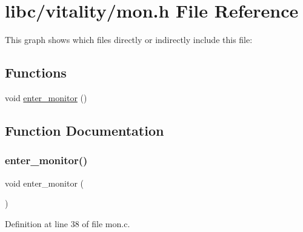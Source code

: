 \hypertarget{a00170}{}\section{libc/vitality/mon.h File Reference}
\label{a00170}
This graph shows which files directly or indirectly include this file\+:
\subsection*{Functions}
\begin{DoxyCompactItemize}
\item 
void \hyperlink{a00170_a33b77c779213ba5f7a0381c995a06f62_a33b77c779213ba5f7a0381c995a06f62}{enter\+\_\+monitor} ()
\end{DoxyCompactItemize}


\subsection{Function Documentation}
\mbox{\label{a00170_a33b77c779213ba5f7a0381c995a06f62_a33b77c779213ba5f7a0381c995a06f62}} 
\subsubsection{\texorpdfstring{enter\+\_\+monitor()}{enter\_monitor()}}
{\footnotesize\ttfamily void enter\+\_\+monitor (\begin{DoxyParamCaption}{ }\end{DoxyParamCaption})}



Definition at line 38 of file mon.\+c.


